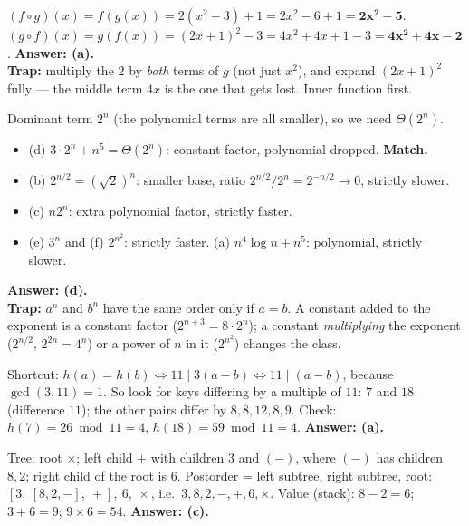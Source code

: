 \documentclass{fkt-notes}
\theoremstyle{definition}
\begin{document}
\begin{example}[Q6: $f(x)=2x+1$, $g(x)=x^2-3$; find $f\circ g$ and $g\circ f$]
  $(f\circ g)(x)=f(g(x))=2(x^2-3)+1=2x^2-6+1=\mathbf{2x^2-5}$.\\
  $(g\circ f)(x)=g(f(x))=(2x+1)^2-3=4x^2+4x+1-3=\mathbf{4x^2+4x-2}$.
  \textbf{Answer: (a).}\\
  \textbf{Trap:} multiply the $2$ by \emph{both} terms of $g$ (not just
  $x^2$), and expand $(2x+1)^2$ fully --- the middle term $4x$ is the
  one that gets lost. Inner function first.
\end{example}

\begin{example}
  Dominant term $2^n$ (the polynomial terms are all smaller), so we need
  $\Theta(2^n)$.
  \begin{itemize}[nosep]
    \item (d) $3\cdot2^n+n^5=\Theta(2^n)$: constant factor, polynomial dropped. \textbf{Match.}
    \item (b) $2^{n/2}=(\sqrt2)^n$: smaller base, ratio $2^{n/2}/2^n=2^{-n/2}\to0$, strictly slower.
    \item (c) $n2^n$: extra polynomial factor, strictly faster.
    \item (e) $3^n$ and (f) $2^{n^2}$: strictly faster. (a) $n^4\log n+n^5$: polynomial, strictly slower.
  \end{itemize}
  \textbf{Answer: (d).}\\
  \textbf{Trap:} $a^n$ and $b^n$ have the same order only if $a=b$. A
  constant added to the exponent is a constant factor ($2^{n+3}=8\cdot2^n$);
  a constant \emph{multiplying} the exponent ($2^{n/2}$, $2^{2n}=4^n$) or
  a power of $n$ in it ($2^{n^2}$) changes the class.
\end{example}

\begin{example}[Q8: $h(k)=(3k+5)\bmod 11$; which pair of keys collides?]
  Shortcut: $h(a)=h(b)\iff11\mid3(a-b)\iff11\mid(a-b)$, because
  $\gcd(3,11)=1$. So look for keys differing by a multiple of $11$: $7$ and
  $18$ (difference $11$); the other pairs differ by $8,8,12,8,9$. Check:
  $h(7)=26\bmod11=4$, $h(18)=59\bmod11=4$. \textbf{Answer: (a).}
\end{example}

\begin{example}
  Tree: root $\times$; left child $+$ with children $3$ and $(-)$, where
  $(-)$ has children $8,2$; right child of the root is $6$.
  Postorder = left subtree, right subtree, root:
  $[3,\ [8,2,-],\ +],\ 6,\ \times$, i.e.\ $3,8,2,-,+,6,\times$.
  Value (stack): $8-2=6$; $3+6=9$; $9\times6=54$. \textbf{Answer: (c).}
\end{example}
\end{document}
